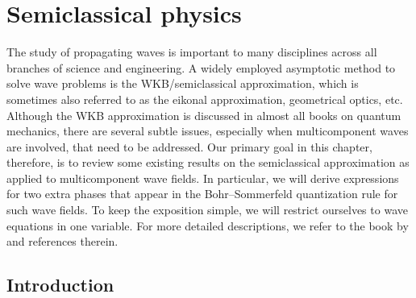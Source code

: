 
\chapter{Semiclassical physics}
\label{chap04}


The study of propagating waves is important to many disciplines across all branches of science and engineering.
A widely employed asymptotic method to solve wave problems is the WKB/semiclassical approximation, which is sometimes also referred to as the eikonal approximation, geometrical optics, etc.
Although the WKB approximation is discussed in almost all books on quantum mechanics, there are several subtle issues, especially when multicomponent waves are involved, that need to be addressed.
Our primary goal in this chapter, therefore, is to review some existing results on the semiclassical approximation as applied to multicomponent wave fields.
In particular, we will derive expressions for two extra phases that appear in the Bohr--Sommerfeld quantization rule for such wave fields.
To keep the exposition simple, we will restrict ourselves to wave equations in one variable.
For more detailed descriptions, we refer to the book by \citet{tracy2014} and references therein.

\section{Introduction}
\label{sec:varintro}

